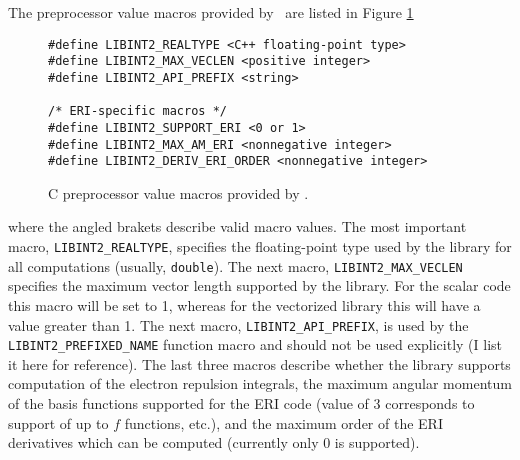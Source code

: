 \documentclass[12pt]{article}
\begin{document}
The preprocessor value macros provided by \libinth\ are listed in Figure \ref{fig:valmacros}
\begin{figure}
\caption{\label{fig:valmacros} C preprocessor value macros provided by \libinth .}
\begin{center}
\begin{minipage}[t]{0.9\linewidth}
\begin{verbatim}
#define LIBINT2_REALTYPE <C++ floating-point type>
#define LIBINT2_MAX_VECLEN <positive integer>
#define LIBINT2_API_PREFIX <string>

/* ERI-specific macros */
#define LIBINT2_SUPPORT_ERI <0 or 1>
#define LIBINT2_MAX_AM_ERI <nonnegative integer>
#define LIBINT2_DERIV_ERI_ORDER <nonnegative integer>
\end{verbatim}
\end{minipage}
\end{center}
\end{figure}
where the angled brakets describe valid macro values.
The most important macro, {\tt LIBINT2\_REALTYPE}, specifies the floating-point type
used by the library for all computations (usually, {\tt double}).
The next macro, {\tt LIBINT2\_MAX\_VECLEN} specifies the maximum vector length supported by the library. For the scalar code
this macro will be set to 1, whereas for the vectorized library this will have a value greater than
1.
The next macro, {\tt LIBINT2\_API\_PREFIX}, is used by the {\tt LIBINT2\_PREFIXED\_NAME} function macro and should not be
used explicitly (I list it here for reference).
The last three macros describe whether the library supports computation of the electron repulsion integrals,
the maximum angular momentum of the basis functions supported for the ERI code (value of 3 corresponds to support
of up to $f$ functions, etc.), and the maximum order of the
ERI derivatives which can be computed (currently only 0 is supported).
\end{document}
